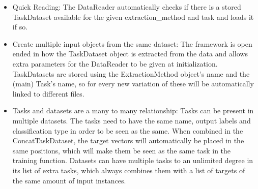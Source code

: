 \begin{itemize}
	\item Quick Reading: The DataReader automatically checks if there is a stored TaskDataset available for the given extraction\_method and task and loads it if so.
	\item Create multiple input objects from the same dataset: The framework is open ended in how the TaskDataset object is extracted from the data and allows extra parameters for the DataReader to be given at initialization. TaskDatasets are stored using the ExtractionMethod object's name and the (main) Task's name, so for every new variation of these will be automatically linked to different files.
	\item Tasks and datasets are a many to many relationship: Tasks can be present in multiple datasets. The tasks need to have the same name, output labels and classification type in order to be seen as the same. When combined in the ConcatTaskDataset, the target vectors will automatically be placed in the same positions, which will make them be seen as the same task in the training function. Datasets can have multiple tasks to an unlimited degree in its list of extra tasks, which always combines them with a list of targets of the same amount of input instances. 
\end{itemize}

